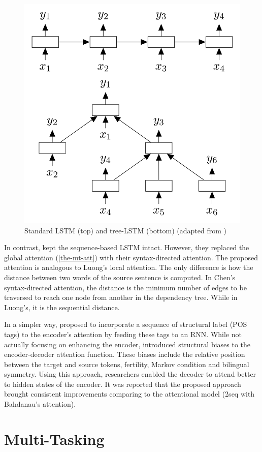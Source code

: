 \begin{figure}[t]
    \centering
    \includegraphics[width=0.7\linewidth]{img/tree-lstm.png}
    \caption{Standard LSTM (top) and tree-LSTM (bottom) (adapted from \cite{DBLP:conf/acl/TaiSM15})}
    \label{fig:tree-lstm}
\end{figure}

In contrast, \cite{DBLP:journals/corr/abs-1711-04231} kept the sequence-based LSTM intact.
However, they replaced the global attention (\cref{the-mt-att}) with their syntax-directed attention.
The proposed attention is analogous to Luong's local attention.
The only difference is how the distance between two words of the source sentence is computed.
In Chen's syntax-directed attention, the distance is the minimum number of edges to be traversed to reach one node from another in the dependency tree.
While in Luong's, it is the sequential distance.

In a simpler way, \cite{DBLP:conf/acl/LiXTZZZ17} proposed to incorporate a sequence of structural label (POS tags) to the encoder's attention by feeding these tags to an RNN.
While not actually focusing on enhancing the encoder, \cite{DBLP:conf/naacl/CohnHVYDH16} introduced structural biases to the encoder-decoder attention function.
These biases include the relative position between the target and source tokens, fertility, Markov condition and bilingual symmetry.
Using this approach, researchers enabled the decoder to attend better to hidden states of the encoder.
It was reported that the proposed approach brought consistent improvements comparing to the attentional model (\seq2seq with Bahdanau's attention).

\section{Multi-Tasking}
\label{lit-mult}


